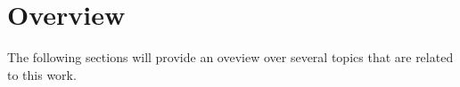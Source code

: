 
\chapter{Overview} %
\label{cha:overview}

The following sections will provide an oveview over several topics that are related to this work.


